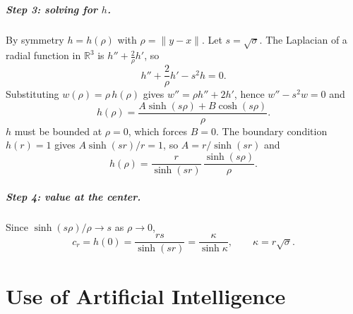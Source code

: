 \documentclass[
]{elteiktdk}[2024/04/26]
\begin{document}
	\paragraph{Step 3: solving for $h$.}
	By symmetry $h=h(\rho)$ with $\rho=\|y-x\|$. Let $s=\sqrt{\sigma}$. The Laplacian of a radial function in
	$\mathbb{R}^3$ is $h''+\frac{2}{\rho}h'$, so
	\begin{equation}
		h''+\frac{2}{\rho}h'-s^2h=0 .
	\end{equation}
	Substituting $w(\rho)=\rho\,h(\rho)$ gives $w''=\rho h''+2h'$, hence
	$w''-s^2w=0$ and
	\begin{equation}
		h(\rho)=\frac{A\sinh(s\rho)+B\cosh(s\rho)}{\rho}.
	\end{equation}
	$h$ must be bounded at $\rho=0$, which forces $B=0$. The boundary condition
	$h(r)=1$ gives $A\sinh(sr)/r=1$, so $A=r/\sinh(sr)$ and
	\begin{equation}
		h(\rho)=\frac{r}{\sinh(sr)}\,\frac{\sinh(s\rho)}{\rho}.
	\end{equation}
	
	\paragraph{Step 4: value at the center.}
	Since $\sinh(s\rho)/\rho\to s$ as $\rho\to 0$,
	\begin{equation}
		c_r=h(0)=\frac{rs}{\sinh(sr)}=\frac{\kappa}{\sinh\kappa},
		\qquad \kappa=r\sqrt{\sigma}.
	\end{equation}

	
	\cleardoublepage
	\printbibliography[title=\biblabel]
	
	\cleardoublepage
	\listoffigures
	
	\cleardoublepage
	\listofalgorithms
	
	\cleardoublepage
	\listoftables
	
	\cleardoublepage
	\chapter*{Use of Artificial Intelligence}
	
\end{document}
